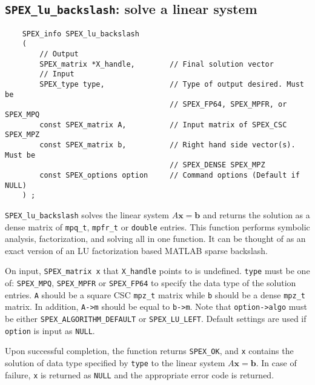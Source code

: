 \documentclass[12pt,oneside]{book}
\theoremstyle{definition}
\renewcommand{\b}{\mathbf{b}}
\newcommand{\x}{\mathbf{x}}
\begin{document}
\subsection{\texttt{SPEX\_lu\_backslash}: solve a linear system}
\label{ss:SPEX_Left_LU_backslash}
\begin{mdframed}[userdefinedwidth=\textwidth]
{\footnotesize
\begin{verbatim}
    SPEX_info SPEX_lu_backslash
    (
        // Output
        SPEX_matrix *X_handle,        // Final solution vector
        // Input
        SPEX_type type,               // Type of output desired. Must be
                                      // SPEX_FP64, SPEX_MPFR, or SPEX_MPQ
        const SPEX_matrix A,          // Input matrix of SPEX_CSC SPEX_MPZ
        const SPEX_matrix b,          // Right hand side vector(s). Must be
                                      // SPEX_DENSE SPEX_MPZ 
        const SPEX_options option     // Command options (Default if NULL)
    ) ;
\end{verbatim}
} \end{mdframed}

\verb|SPEX_lu_backslash| solves the linear system $A \x= \b$ and returns the solution
as a dense matrix of \verb|mpq_t|, \verb|mpfr_t| or \verb|double| entries. This
function performs symbolic analysis, factorization, and solving all in one function. 
It can be thought of as an exact version of an LU factorization based MATLAB sparse backslash.

On input, \verb|SPEX_matrix x| that \verb|X_handle| points to is undefined. \verb|type| must be one of:
\verb|SPEX_MPQ|, \verb|SPEX_MPFR| or \verb|SPEX_FP64| to specify the data type
of the solution entries. \verb|A| should be a square CSC \verb|mpz_t| matrix
while \verb|b| should be a dense \verb|mpz_t| matrix. In addition, \verb|A->m|
should be equal to \verb|b->m|.
Note that \verb|option->algo| must be either \verb|SPEX_ALGORITHM_DEFAULT| or 
\verb|SPEX_LU_LEFT|. Default settings are used if
\verb|option| is input as \verb|NULL|.

Upon successful completion, the function returns \verb|SPEX_OK|, and
\verb|x| contains the solution of data type specified by
\verb|type| to the linear system $A\x=\b$. In case of failure, \verb|x| is returned as \verb|NULL| and the appropriate error code is returned.
\end{document}
